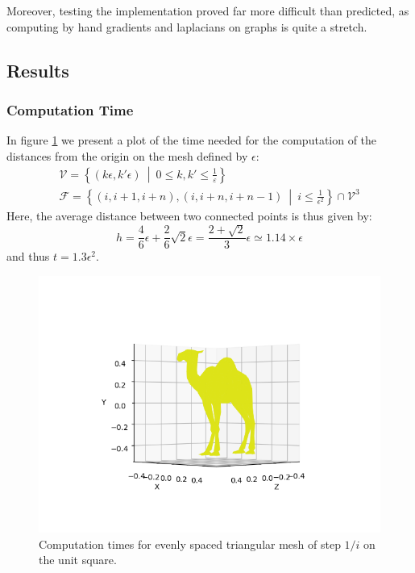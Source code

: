 \documentclass[math, info, english]{cours}
\def\mF{\mathcal{F}}
\def\mV{\mathcal{V}}
\begin{document}
Moreover, testing the implementation proved far more difficult than predicted, as computing by hand gradients and laplacians on graphs is quite a stretch.

\subsection{Results}
\subsubsection{Computation Time}
In figure \ref{computationtime} we present a plot of the time needed for the computation of the distances from the origin on the mesh defined by $\epsilon$:
\begin{align*}
	\mV = \left\{ \left( k\epsilon, k'\epsilon \right) \ \middle| \ 0 \leq k, k' \leq \frac{1}{\varepsilon} \right\}\\
	\mF = \left\{ \left( i, i + 1, i + n \right), \left( i, i + n, i + n -1 \right) \ \middle| \ i \leq \frac{1}{\epsilon^{2}} \right\} \cap \mV^{3}
\end{align*}
Here, the average distance between two connected points is thus given by:
\begin{equation*}
	h = \frac{4}{6}\epsilon + \frac{2}{6}\sqrt{2}\epsilon = \frac{2 + \sqrt{2}}{3}\epsilon \simeq 1.14 \times \epsilon
\end{equation*}
and thus $t = 1.3\epsilon^{2}$.

\begin{figure}[h]
	\centering
	\includegraphics{Figures/camel_t=1000_i=50_True.png}
	\caption{Computation times for evenly spaced triangular mesh of step $1/i$ on the unit square.}
	\label{computationtime}
\end{figure}
\end{document}
